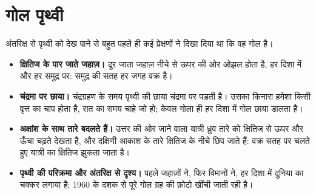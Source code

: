 \section{गोल पृथ्वी}

अंतरिक्ष से पृथ्वी को देख पाने से बहुत पहले ही कई प्रेक्षणों ने दिखा दिया था कि वह गोल है।
\begin{itemize}
  \item \textbf{क्षितिज के पार जाते जहाज़।} दूर जाता जहाज़ नीचे से ऊपर की ओर ओझल होता है,
        हर दिशा में और हर समुद्र पर: समुद्र की सतह हर जगह वक्र है।
  \item \textbf{चंद्रमा पर छाया।} चंद्रग्रहण के समय पृथ्वी की छाया चंद्रमा पर पड़ती है। उसका
        किनारा हमेशा किसी वृत्त का चाप होता है, रात का समय चाहे जो हो; केवल गोला ही हर
        दिशा में गोल छाया डालता है।
  \item \textbf{अक्षांश के साथ तारे बदलते हैं।} उत्तर की ओर जाने वाला यात्री ध्रुव तारे को
        क्षितिज से ऊपर और ऊँचा चढ़ते देखता है, और दक्षिणी आकाश के तारे क्षितिज के नीचे
        छिप जाते हैं: वक्र सतह पर चलते हुए यात्री का क्षितिज झुकता जाता है।
  \item \textbf{पृथ्वी की परिक्रमा और अंतरिक्ष से दृश्य।} पहले जहाज़ों ने, फिर विमानों ने, हर
        दिशा में दुनिया का चक्कर लगाया है; 1960 के दशक से पूरे गोल ग्रह की फ़ोटो खींची
        जाती रही है।
\end{itemize}

